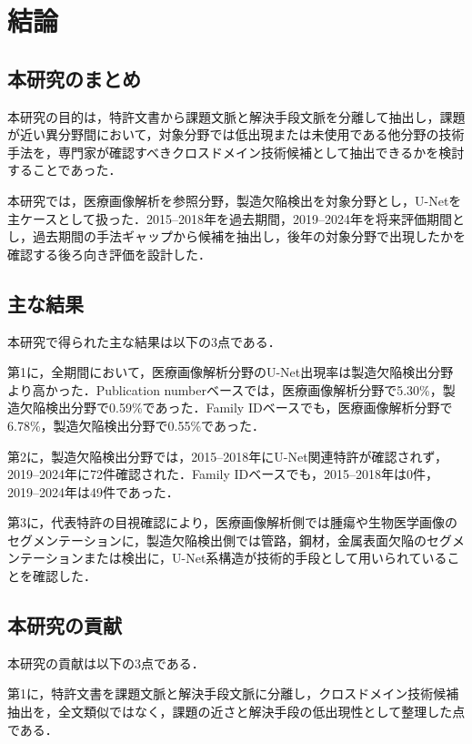 \chapter{結論}

\section{本研究のまとめ}
本研究の目的は，特許文書から課題文脈と解決手段文脈を分離して抽出し，課題が近い異分野間において，対象分野では低出現または未使用である他分野の技術手法を，専門家が確認すべきクロスドメイン技術候補として抽出できるかを検討することであった．

本研究では，医療画像解析を参照分野，製造欠陥検出を対象分野とし，U-Netを主ケースとして扱った．2015--2018年を過去期間，2019--2024年を将来評価期間とし，過去期間の手法ギャップから候補を抽出し，後年の対象分野で出現したかを確認する後ろ向き評価を設計した．

\section{主な結果}
本研究で得られた主な結果は以下の3点である．

第1に，全期間において，医療画像解析分野のU-Net出現率は製造欠陥検出分野より高かった．Publication numberベースでは，医療画像解析分野で5.30\%，製造欠陥検出分野で0.59\%であった．Family IDベースでも，医療画像解析分野で6.78\%，製造欠陥検出分野で0.55\%であった．

第2に，製造欠陥検出分野では，2015--2018年にU-Net関連特許が確認されず，2019--2024年に72件確認された．Family IDベースでも，2015--2018年は0件，2019--2024年は49件であった．

第3に，代表特許の目視確認により，医療画像解析側では腫瘍や生物医学画像のセグメンテーションに，製造欠陥検出側では管路，鋼材，金属表面欠陥のセグメンテーションまたは検出に，U-Net系構造が技術的手段として用いられていることを確認した．

\section{本研究の貢献}
本研究の貢献は以下の3点である．

第1に，特許文書を課題文脈と解決手段文脈に分離し，クロスドメイン技術候補抽出を，全文類似ではなく，課題の近さと解決手段の低出現性として整理した点である．

